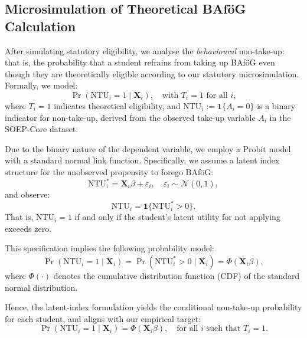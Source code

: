 \subsection{Microsimulation of Theoretical BAföG Calculation}

After simulating statutory eligibility, we analyse the \textit{behavioural} non-take-up: 
that is, the probability that a student refrains from taking up BAföG even though they are theoretically eligible according to our statutory microsimulation. 
Formally, we model:
\begin{equation}
  \Pr(\mathrm{NTU}_i = 1 \mid \mathbf{X}_i), \quad \text{with } T_i = 1 \text{ for all } i,
\end{equation}
where \( T_i = 1 \) indicates theoretical eligibility, and \( \mathrm{NTU}_i := \mathbf{1}\{A_i = 0\} \) is a binary indicator for non-take-up, derived from the observed take-up variable \( A_i \) in the SOEP-Core dataset.

Due to the binary nature of the dependent variable, we employ a Probit model with a standard normal link function. Specifically, we assume a latent index structure for the unobserved propensity to forego BAföG:
\begin{equation}
  \mathrm{NTU}_i^* = \mathbf{X}_i \beta + \varepsilon_i, 
  \quad 
  \varepsilon_i \sim \mathcal{N}(0,1),
\end{equation}
and observe:
\begin{equation}
  \mathrm{NTU}_i = \mathbf{1} \{ \mathrm{NTU}_i^* > 0 \}.
\end{equation}
That is, \( \mathrm{NTU}_i = 1 \) if and only if the student's latent utility for not applying exceeds zero.

This specification implies the following probability model:
\begin{equation}
  \Pr(\mathrm{NTU}_i = 1 \mid \mathbf{X}_i) = \Pr(\mathrm{NTU}_i^* > 0 \mid \mathbf{X}_i) = \Phi(\mathbf{X}_i \beta),
\end{equation}
where \( \Phi(\cdot) \) denotes the cumulative distribution function (CDF) of the standard normal distribution.

Hence, the latent-index formulation yields the conditional non-take-up probability for each student, and aligns with our empirical target:
\[
\Pr(\mathrm{NTU}_i = 1 \mid \mathbf{X}_i) = \Phi(\mathbf{X}_i \beta), \quad \text{for all } i \text{ such that } T_i = 1.
\]


